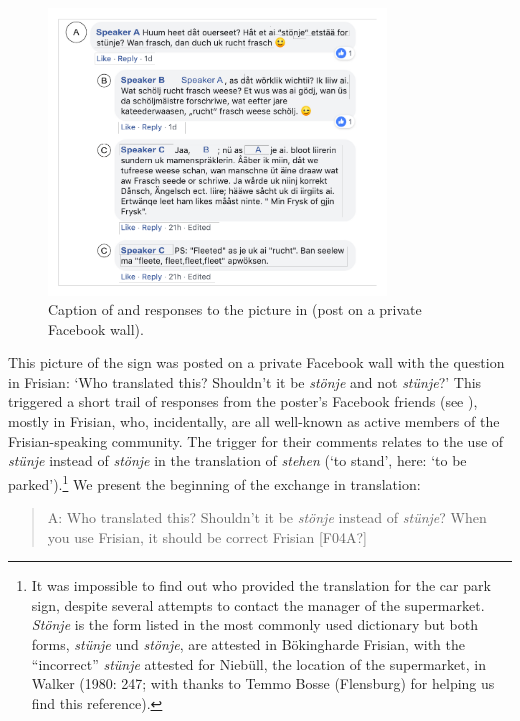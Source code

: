 \documentclass[output=paper]{langsci/langscibook}
\begin{document}
  
 

\begin{figure}
\includegraphics[width=0.8\textwidth]{figures/fig2_gregersen.pdf}
\caption{Caption of and responses to the picture in  (post on a private Facebook wall).}\label{fig:gregersen:2}
\end{figure}

This picture of the sign was posted on a private Facebook wall with the question in Frisian: ‘Who translated this? Shouldn’t it be \textit{stönje} and not \textit{stünje}?’ This triggered a short trail of responses from the poster’s Facebook friends (see ), mostly in Frisian, who, incidentally, are all well-known as active members of the Frisian-speaking community. The trigger for their comments relates to the use of \textit{stünje} instead of \textit{stönje} in the translation of \textit{stehen} (‘to stand’, here: ‘to be parked’).\footnote{It was impossible to find out who provided the translation for the car park sign, despite several attempts to contact the manager of the supermarket. \textit{Stönje} is the form listed in the most commonly used dictionary but both forms, \textit{stünje} und \textit{stönje}, are attested in Bökingharde Frisian, with the “incorrect” \textit{stünje} attested for Niebüll, the location of the supermarket, in Walker (1980: 247; with thanks to Temmo Bosse (Flensburg) for helping us find this reference).} We present the beginning of the exchange in translation:

\begin{quote}
A: Who translated this? Shouldn’t it be \textit{stönje} instead of \textit{stünje}? When you use Frisian, it should be correct Frisian [F04A?]
\end{quote}
\end{document}
